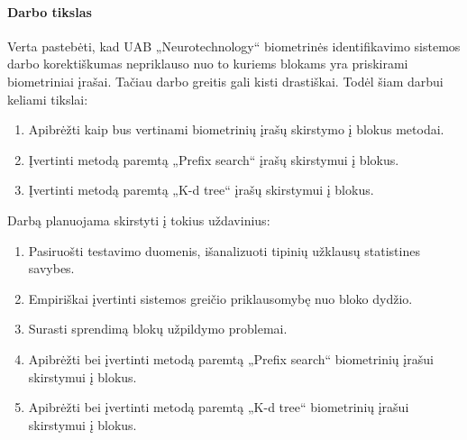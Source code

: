 \paragraph{Darbo tikslas}

Verta pastebėti, kad UAB „Neurotechnology“ biometrinės identifikavimo sistemos darbo korektiškumas nepriklauso nuo to kuriems blokams yra priskirami biometriniai įrašai.
Tačiau darbo greitis gali kisti drastiškai.
Todėl šiam darbui keliami tikslai:
\begin{enumerate}
	\item Apibrėžti kaip bus vertinami biometrinių įrašų skirstymo į blokus metodai.
	\item Įvertinti metodą paremtą „Prefix search“ įrašų skirstymui į blokus.
	\item Įvertinti metodą paremtą „K-d tree“ įrašų skirstymui į blokus.
\end{enumerate}

Darbą planuojama skirstyti į tokius uždavinius:

\begin{enumerate}
	\item Pasiruošti testavimo duomenis, išanalizuoti tipinių užklausų statistines savybes.
	\item Empiriškai įvertinti sistemos greičio priklausomybę nuo bloko dydžio.
	\item Surasti sprendimą blokų užpildymo problemai.
	\item Apibrėžti bei įvertinti metodą paremtą „Prefix search“ biometrinių įrašui skirstymui į blokus.
	\item Apibrėžti bei įvertinti metodą paremtą „K-d tree“ biometrinių įrašui skirstymui į blokus.
\end{enumerate}


